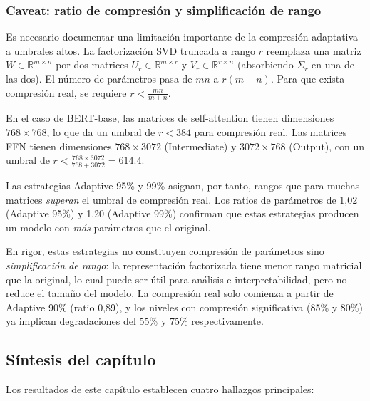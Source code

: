 \subsubsection{Caveat: ratio de compresión y simplificación de rango}
\label{sec:caveat-compresion}

Es necesario documentar una limitación importante de la compresión adaptativa a umbrales
altos. La factorización SVD truncada a rango $r$ reemplaza una matriz $W \in \mathbb{R}^{m
\times n}$ por dos matrices $U_r \in \mathbb{R}^{m \times r}$ y $V_r \in \mathbb{R}^{r
\times n}$ (absorbiendo $\Sigma_r$ en una de las dos). El número de parámetros pasa de
$mn$ a $r(m + n)$. Para que exista compresión real, se requiere $r < \frac{mn}{m+n}$.

En el caso de BERT-base, las matrices de self-attention tienen dimensiones $768 \times 768$,
lo que da un umbral de $r < 384$ para compresión real. Las matrices FFN tienen dimensiones
$768 \times 3072$ (Intermediate) y $3072 \times 768$ (Output), con un umbral de
$r < \frac{768 \times 3072}{768 + 3072} = 614.4$.

Las estrategias Adaptive 95\% y 99\% asignan, por tanto, rangos que para muchas
matrices \emph{superan} el umbral de compresión real. Los ratios de parámetros de
1{,}02 (Adaptive 95\%) y 1{,}20 (Adaptive 99\%) confirman que estas estrategias
producen un modelo con \emph{más} parámetros que el original.

En rigor, estas estrategias no constituyen compresión de parámetros sino
\emph{simplificación de rango}: la representación factorizada tiene menor rango
matricial que la original, lo cual puede ser útil para análisis e interpretabilidad, pero
no reduce el tamaño del modelo. La compresión real solo comienza a partir de Adaptive
90\% (ratio 0{,}89), y los niveles con compresión significativa (85\% y 80\%)
ya implican degradaciones del 55\% y 75\% respectivamente.



\subsection{Síntesis del capítulo}
\label{sec:sintesis-compresion}

Los resultados de este capítulo establecen cuatro hallazgos principales:

